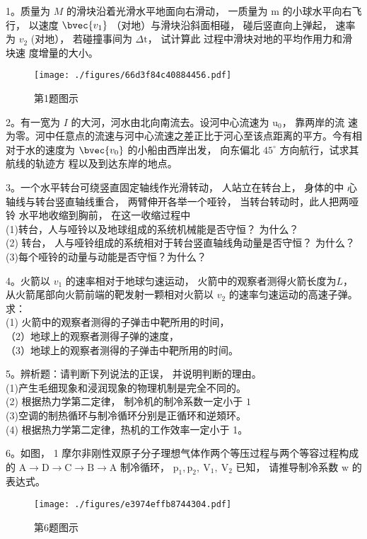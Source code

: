
1。质量为 $M$ 的滑块沿着光滑水平地面向右滑动， 一质量为 $\mathrm{m}$ 的小球水平向右飞行， 以速度 $\bvec{v_1}$ （对地）与滑块沿斜面相碰， 碰后竖直向上弹起， 速率为
$v_2$ (对地）， 若碰撞事间为 $\Delta \mathrm{t}$， 试计算此 过程中滑块对地的平均作用力和滑块速
度增量的大小。
\begin{figure}[ht]
\centering
\texttt{[image: ./figures/66d3f84c40884456.pdf]}
\caption{第1题图示} \label{fig_BNU12_1}
\end{figure}

2。有一宽为 $I$ 的大河，河水由北向南流去。设河中心流速为 $\mathrm{u}_{0}$， 靠两岸的流 速为零。河中任意点的流速与河中心流速之差正比于河心至该点距离的平方。今有相 对于水的速度为 $\bvec{v_0}$ 的小船由西岸出发， 向东偏北 $45^{\circ}$ 方向航行，试求其航线的轨迹方 程以及到达东岸的地点。

3。一个水平转台可绕竖直固定轴线作光滑转动， 人站立在转台上， 身体的中 心轴线与转台竖直轴线重合， 两臂伸开各举一个哑铃， 当转台转动时，此人把两哑铃 水平地收缩到胸前， 在这一收缩过程中\\
(1)转台，人与哑铃以及地球组成的系统机械能是否守恒？ 为什么？\\
(2) 转台， 人与哑铃组成的系统相对于转台竖直轴线角动量是否守恒？ 为什么？
(3)每个哑铃的动量与动能是否守恒？为什么？

4。火箭以 $v_1$ 的速率相对于地球匀速运动， 火箭中的观察者测得火箭长度为$L$，从火箭尾部向火箭前端的靶发射一颗相对火箭以 $v_{2}$ 的速率匀速运动的高速子弹。 求： \\(1) 火箭中的观察者测得的子弹击中靶所用的时间， \\（2）地球上的观察者测得子弹的速度， \\（3）地球上的观察者测得的子弹击中靶所用的时间。

5。辨析题：请判断下列说法的正误， 并说明判断的理由。\\
(1)产生毛细现象和浸润现象的物理机制是完全不同的。\\
(2) 根据热力学第二定律， 制冷机的制冷系数一定小于 $1$\\
(3)空调的制热循环与制冷循环分别是正循环和逆頍环。\\
(4) 根据热力学第二定律，热机的工作效率一定小于 1。

6。如图， 1 摩尔非刚性双原子分子理想气体作两个等压过程与两个等容过程构成的 $\mathrm{A} \rightarrow \mathrm{D} \rightarrow \mathrm{C} \rightarrow \mathrm{B} \rightarrow \mathrm{A}$
制冷循环， $\mathrm{p}_{1}, \mathrm{p}_{2}, \mathrm{~V}_{1}, \mathrm{~V}_{2}$ 已知， 请推导制冷系数 $\mathrm{w}$ 的表达式。
\begin{figure}[ht]
\centering
\texttt{[image: ./figures/e3974effb8744304.pdf]}
\caption{第6题图示} \label{fig_BNU12_2}
\end{figure}

